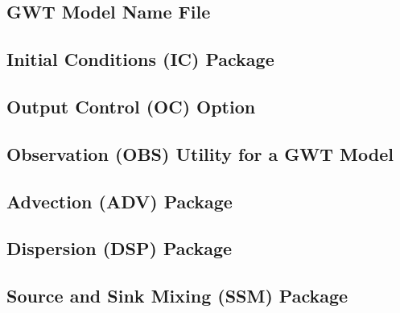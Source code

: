 \newpage
\subsection{GWT Model Name File}


%

%

%

\newpage
\subsection{Initial Conditions (IC) Package}


\newpage
\subsection{Output Control (OC) Option}


\newpage
\subsection{Observation (OBS) Utility for a GWT Model}


\newpage
\subsection{Advection (ADV) Package}


\newpage
\subsection{Dispersion (DSP) Package}


\newpage
\subsection{Source and Sink Mixing (SSM) Package}


